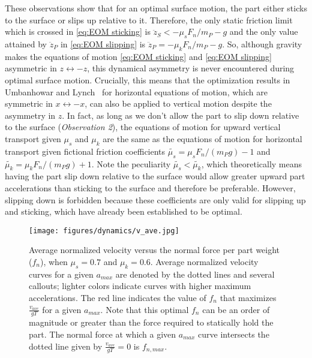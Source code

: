 These observations show that for an optimal surface motion, the part either sticks to the surface or slips up relative to it. 
%
Therefore, the only static friction limit which is crossed in \eqref{eq:EOM sticking} is $\ddot{z}_S < -\mu_s F_n/m_P -g$ and the only value attained by $\ddot{z}_P$ in \eqref{eq:EOM slipping} is $\ddot{z}_P = -\mu_k F_n/m_P - g$.
%
So, although gravity makes the equations of motion \eqref{eq:EOM sticking} and \eqref{eq:EOM slipping} asymmetric in $z \leftrightarrow -z$, this dynamical asymmetry is never encountered during optimal surface motion.
%
Crucially, this means that the optimization results in Umbanhowar and Lynch~\cite{umbanhowar2008optimal} for horizontal equations of motion, which are symmetric in $x \leftrightarrow -x$, can also be applied to vertical motion despite the asymmetry in $z$.
%
In fact, as long as we don't allow the part to slip down relative to the surface (\textit{Observation 2}), the equations of motion for upward vertical transport given $\mu_s$ and $\mu_k$ are the same as the equations of motion for horizontal transport given fictional friction coefficients $\widetilde{\mu_s} = \mu_s F_n/(m_P g) - 1$ and $\widetilde{\mu_k} = \mu_k F_n/(m_P g) + 1$.
%
Note the peculiarity $\widetilde{\mu_s} < \widetilde{\mu_k}$, which theoretically means having the part slip down relative to the surface would allow greater upward part accelerations than sticking to the surface and therefore be preferable. However, slipping down is forbidden because these coefficients are only valid for slipping up and sticking, which have already been established to be optimal.

\begin{figure}[t]
    \centering
    \texttt{[image: figures/dynamics/v\_ave.jpg]}
    \caption{Average normalized velocity versus the normal force per part weight ($f_n$), when $\mu_s = 0.7$ and $\mu_k = 0.6$. 
    Average normalized velocity curves for a given $a_{max}$ are denoted by the dotted lines and several callouts; lighter colors indicate curves with higher maximum accelerations. 
    The red line indicates the value of $f_n$ that maximizes $\frac{v_{ave}}{gT}$ for a given $a_{max}$. 
    Note that this optimal $f_n$ can be an order of magnitude or greater than the force required to statically hold the part.
    The normal force at which a given $a_{max}$ curve intersects the dotted line given by $\frac{v_{ave}}{gT} = 0$ is $f_{n,max}$.}
    \label{figure: v_ave}
    \vspace{\shift}
\end{figure}

